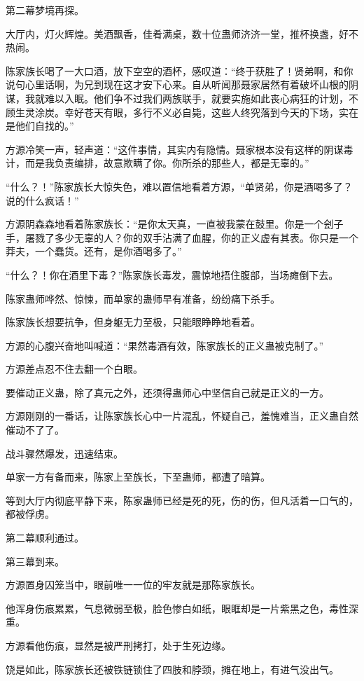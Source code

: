 \begin{this_body}
第二幕梦境再探。

大厅内，灯火辉煌。美酒飘香，佳肴满桌，数十位蛊师济济一堂，推杯换盏，好不热闹。

陈家族长喝了一大口酒，放下空空的酒杯，感叹道：“终于获胜了！贤弟啊，和你说句心里话啊，为兄到现在这才安下心来。自从听闻那聂家居然有着破坏山根的阴谋，我就难以入眠。他们争不过我们两族联手，就要实施如此丧心病狂的计划，不顾生灵涂炭。幸好苍天有眼，多行不义必自毙，这些人终究落到今天的下场，实在是他们自找的。”

方源冷笑一声，轻声道：“这件事情，其实内有隐情。聂家根本没有这样的阴谋毒计，而是我负责编排，故意欺瞒了你。你所杀的那些人，都是无辜的。”

“什么？！”陈家族长大惊失色，难以置信地看着方源，“单贤弟，你是酒喝多了？说的什么疯话！”

方源阴森森地看着陈家族长：“是你太天真，一直被我蒙在鼓里。你是一个刽子手，屠戮了多少无辜的人？你的双手沾满了血腥，你的正义虚有其表。你只是一个莽夫，一个蠢货。还有，是你酒喝多了。”

“什么？！你在酒里下毒？”陈家族长毒发，震惊地捂住腹部，当场瘫倒下去。

陈家蛊师哗然、惊悚，而单家的蛊师早有准备，纷纷痛下杀手。

陈家族长想要抗争，但身躯无力至极，只能眼睁睁地看着。

方源的心腹兴奋地叫喊道：“果然毒酒有效，陈家族长的正义蛊被克制了。”

方源差点忍不住去翻一个白眼。

要催动正义蛊，除了真元之外，还须得蛊师心中坚信自己就是正义的一方。

方源刚刚的一番话，让陈家族长心中一片混乱，怀疑自己，羞愧难当，正义蛊自然催动不了了。

战斗骤然爆发，迅速结束。

单家一方有备而来，陈家上至族长，下至蛊师，都遭了暗算。

等到大厅内彻底平静下来，陈家蛊师已经是死的死，伤的伤，但凡活着一口气的，都被俘虏。

第二幕顺利通过。

第三幕到来。

方源置身囚笼当中，眼前唯一一位的牢友就是那陈家族长。

他浑身伤痕累累，气息微弱至极，脸色惨白如纸，眼眶却是一片紫黑之色，毒性深重。

方源看他伤痕，显然是被严刑拷打，处于生死边缘。

饶是如此，陈家族长还被铁链锁住了四肢和脖颈，摊在地上，有进气没出气。


\end{this_body}
